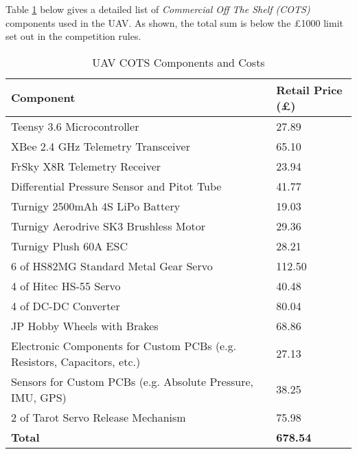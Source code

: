 Table \ref{tab:cots} below gives a detailed list of \textit{Commercial Off The Shelf (COTS)} components used in the UAV. As shown, the total sum is below the \pounds 1000 limit set out in the competition rules.

\begin{table}[h]
\centering
\begin{tabular}{p{}|>{\hfill}p{}} 
\textbf{Component} & \textbf{Retail Price (\pounds)} \\ \hline
Teensy 3.6 Microcontroller & 27.89 \\ \hline
XBee 2.4 GHz Telemetry Transceiver & 65.10 \\ \hline
FrSky X8R Telemetry Receiver & 23.94 \\ \hline
Differential Pressure Sensor and Pitot Tube & 41.77 \\ \hline
Turnigy 2500mAh 4S LiPo Battery & 19.03 \\ \hline
Turnigy Aerodrive SK3 Brushless Motor & 29.36 \\ \hline
Turnigy Plush 60A ESC & 28.21 \\ \hline
6 of HS82MG Standard Metal Gear Servo & 112.50 \\ \hline
4 of Hitec HS-55 Servo & 40.48 \\ \hline
4 of DC-DC Converter & 80.04 \\ \hline
JP Hobby Wheels with Brakes & 68.86 \\ \hline
Electronic Components for Custom PCBs (e.g. Resistors, Capacitors, etc.) & 27.13 \\ \hline
Sensors for Custom PCBs (e.g. Absolute Pressure, IMU, GPS) & 38.25 \\ \hline 
2 of Tarot Servo Release Mechanism & 75.98 \\ \hline
\textbf{Total} & \textbf{678.54} \\
\end{tabular}
\caption{UAV COTS Components and Costs}
\label{tab:cots}
\end{table}
